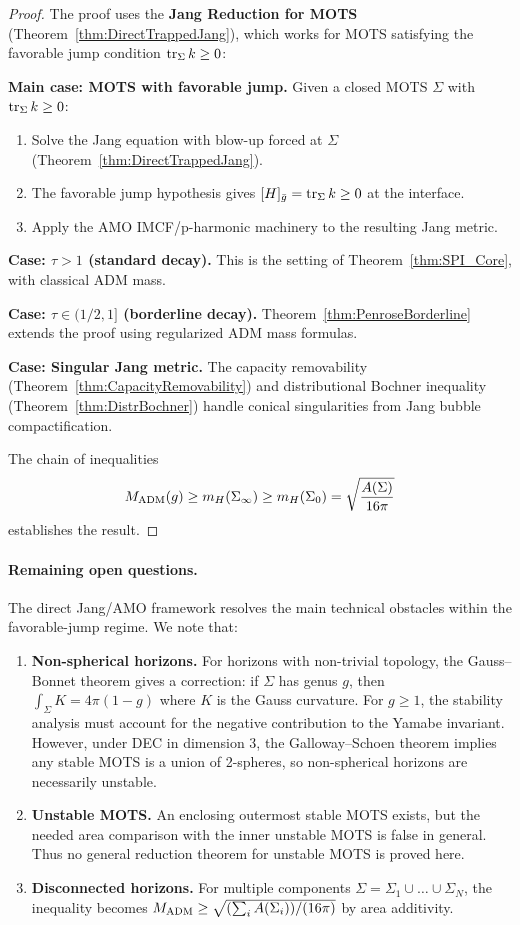 \begin{proof}
The proof uses the \textbf{Jang Reduction for MOTS} (Theorem~\ref{thm:DirectTrappedJang}), which works for MOTS satisfying the favorable jump condition $\operatorname{tr}_\Sigma k \ge 0$:

\textbf{Main case: MOTS with favorable jump.}
Given a closed MOTS $\Sigma$ with $\operatorname{tr}_\Sigma k \ge 0$:
\begin{enumerate}
    \item Solve the Jang equation with blow-up forced at $\Sigma$ (Theorem~\ref{thm:DirectTrappedJang}).
    \item The favorable jump hypothesis gives $[H]_{\bar{g}} = \operatorname{tr}_\Sigma k \ge 0$ at the interface.
    \item Apply the AMO IMCF/p-harmonic machinery to the resulting Jang metric.
\end{enumerate}

\textbf{Case: $\tau > 1$ (standard decay).}
This is the setting of Theorem~\ref{thm:SPI_Core}, with classical ADM mass.

\textbf{Case: $\tau \in (1/2, 1]$ (borderline decay).}
Theorem~\ref{thm:PenroseBorderline} extends the proof using regularized ADM mass formulas.

\textbf{Case: Singular Jang metric.}
The capacity removability (Theorem~\ref{thm:CapacityRemovability}) and distributional Bochner inequality (Theorem~\ref{thm:DistrBochner}) handle conical singularities from Jang bubble compactification.

The chain of inequalities
\[
    M_{\mathrm{ADM}}(g) \ge m_H(\Sigma_\infty) \ge m_H(\Sigma_0) = \sqrt{\frac{A(\Sigma)}{16\pi}}
\]
establishes the result.
\end{proof}

\paragraph{Remaining open questions.}
The direct Jang/AMO framework resolves the main technical obstacles within the favorable-jump regime. We note that:
\begin{enumerate}
    \item \textbf{Non-spherical horizons.} For horizons with non-trivial topology, the Gauss--Bonnet theorem gives a correction: if $\Sigma$ has genus $g$, then $\int_\Sigma K = 4\pi(1-g)$ where $K$ is the Gauss curvature. For $g \ge 1$, the stability analysis must account for the negative contribution to the Yamabe invariant. However, under DEC in dimension 3, the Galloway--Schoen theorem \cite{gallowayschoen2006} implies any stable MOTS is a union of 2-spheres, so non-spherical horizons are necessarily unstable.
    \item \textbf{Unstable MOTS.} An enclosing outermost stable MOTS exists, but the needed area comparison with the inner unstable MOTS is false in general. Thus no general reduction theorem for unstable MOTS is proved here.
    \item \textbf{Disconnected horizons.} For multiple components $\Sigma = \Sigma_1 \cup \ldots \cup \Sigma_N$, the inequality becomes $M_{\mathrm{ADM}} \ge \sqrt{(\sum_i A(\Sigma_i))/(16\pi)}$ by area additivity.
\end{enumerate}

